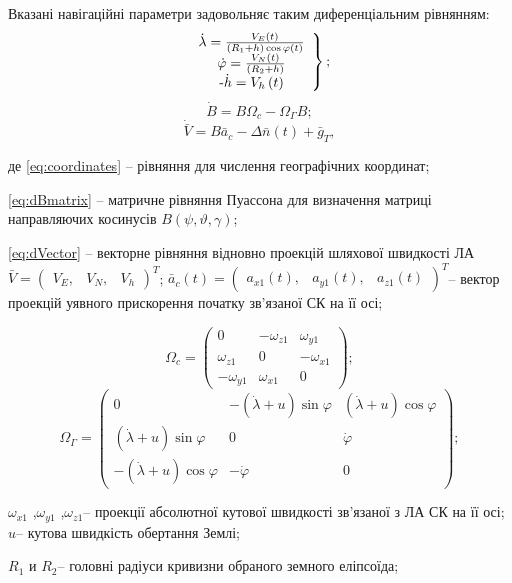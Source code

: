 Вказані навігаційні параметри задовольняє таким диференціальним рівнянням:
\begin{equation}
\left .
\begin{array}{c} 
{\dot{\lambda }=
\frac{V_{E} \left(t\right)}{\left(R_{1}+h\right)\cos \varphi \left(t\right)} } \\ 
{\dot{\varphi }=\frac{V_{N} \left(t\right)}{\left(R_{2} +h\right)} } \\ $-$
{\dot{h}=V_{h} \left(t\right)} \end{array}\right\};
\label{eq:coordinates}
\end{equation}
\begin{equation}
\dot{B}=B\Omega_{c} -\Omega_{\Gamma}B ;               
\label{eq:dBmatrix}
\end{equation}
\begin{equation}
\dot{\bar{V}}=B\bar{a}_{c} -\Delta \bar{n}\left(t\right)+\bar{g}_{T} ,     
\label{eq:dVector}
\end{equation}
\begin{ESKDexplanation}
\item де \eqref{eq:coordinates} -- рівняння для числення географічних координат; 
\item \eqref{eq:dBmatrix} -- матричне рівняння Пуассона для визначення матриці 
направляючих косинусів $B\left(\psi ,\vartheta ,\gamma \right)$; 
\item \eqref{eq:dVector} -- векторне рівняння відновно 
проекцій шляхової швидкості ЛА 
$\bar{V}=\left(\begin{array}{ccc} {V_{E} ,} & {V_{N} 
,} & {V_{h} } \end{array}\right)^{T} $; $\bar{a}_{c} \left(t\right)=\left(\begin{array}{ccc} 
{a_{x1} \left(t\right),} & {a_{y1} \left(t\right),} & {a_{z1} \left(t\right)} \end{array}
\right)^{T} $-- вектор проекцій уявного прискорення початку зв'язаної СК на її осі;
\end{ESKDexplanation}
\[\Omega_{c} =\left(\begin{array}{ccc} 
{0} & {-\omega {}_{z1} } & {\omega {}_{y1} } \\ 
{\omega {}_{z1} } & {0} & {-\omega {}_{x1} } \\ 
{-\omega {}_{y1} } & {\omega {}_{x1}} & {0} 
\end{array}\right);\] 
\[\Omega _{\Gamma } =\left(\begin{array}{ccc} 
{0} & {-(\dot{\lambda }+u)\sin \varphi } & {(\dot{\lambda }+u)\cos \varphi } \\ 
{(\dot{\lambda}+u)\sin \varphi } & {0} & {\dot{\varphi }} \\
{-(\dot{\lambda }+u)\cos \varphi } & {-\dot{\varphi }} & {0} 
\end{array}\right);\] 
\begin{ESKDexplanation}
\item $\omega _{x1}$ ,$\omega _{y1}$ ,$\omega _{z1}$-- проекції абсолютної кутової швидкості 
зв'язаної з ЛА СК на її осі; $u$-- кутова швидкість обертання Землі; 
\item $R_{1} $ и $R_{2} $-- головні радіуси кривизни обраного земного еліпсоїда;
\end{ESKDexplanation}

